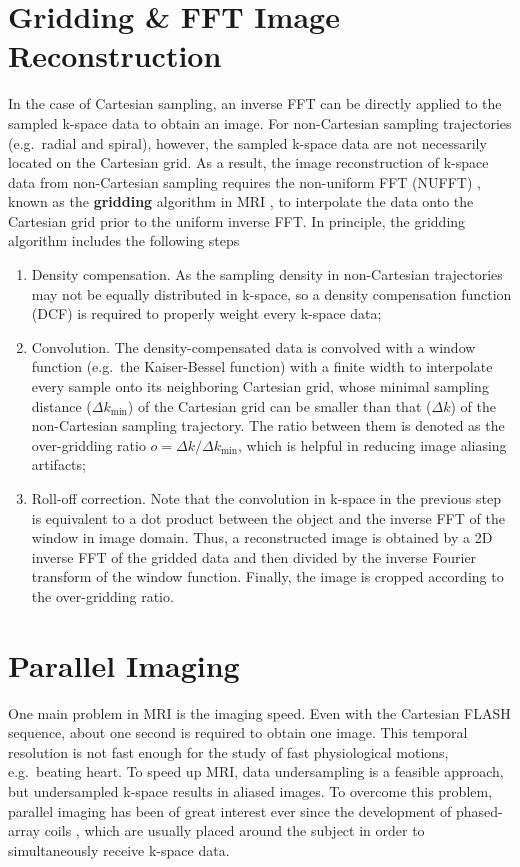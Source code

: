 \section{Gridding \& FFT Image Reconstruction} \label{Sec:mri_grid}
In the case of Cartesian sampling, an inverse \acs{FFT} can be directly applied to the sampled k-space data to obtain an image. For non-Cartesian sampling trajectories (e.g.~radial and spiral), however, the sampled k-space data are not necessarily located on the Cartesian grid. As a result, the image reconstruction of k-space data from non-Cartesian sampling requires the non-uniform FFT (\acs{NUFFT}) \cite{2003_NUFFT}, known as the \textbf{gridding} algorithm in MRI \cite{1991_conv_gridding,1999_gridding_TMI,2005_gridding,2008_Block_Thesis}, to interpolate the data onto the Cartesian grid prior to the uniform inverse FFT. In principle, the gridding algorithm includes the following steps
\begin{enumerate}
\item Density compensation. As the sampling density in non-Cartesian trajectories may not be equally distributed in k-space, so a density compensation function (DCF) is required to properly weight every k-space data;
\item Convolution. The density-compensated data is convolved with a window function (e.g.~the Kaiser-Bessel function) with a finite width to interpolate every sample onto its neighboring Cartesian grid, whose minimal sampling distance ($\Delta k_{\text{min}}$) of the Cartesian grid can be smaller than that ($\Delta k$) of the non-Cartesian sampling trajectory. The ratio between them is denoted as the over-gridding ratio $o = \Delta k / \Delta k_{\text{min}}$, which is helpful in reducing image aliasing artifacts;
\item Roll-off correction. Note that the convolution in k-space in the previous step is equivalent to a dot product between the object and the inverse FFT of the window in image domain. Thus, a reconstructed image is obtained by a 2D inverse FFT of the gridded data and then divided by the inverse Fourier transform of the window function. Finally, the image is cropped according to the over-gridding ratio.
\end{enumerate}



\section{Parallel Imaging} \label{Sec:mri_pi}
One main problem in MRI is the imaging speed. Even with the Cartesian FLASH sequence, about one second is required to obtain one image. This temporal resolution is not fast enough for the study of fast physiological motions, e.g.~beating heart. To speed up MRI, data undersampling is a feasible approach, but undersampled k-space results in aliased images. To overcome this problem, parallel imaging has been of great interest ever since the development of phased-array coils \cite{1990_phased_array}, which are usually placed around the subject in order to simultaneously receive k-space data. 

